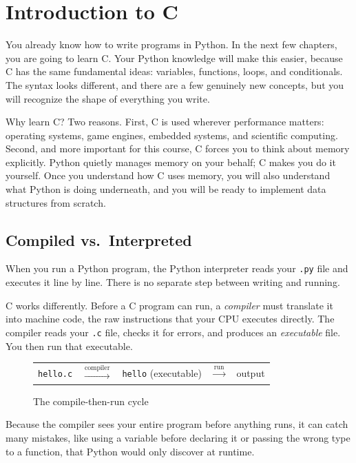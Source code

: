 \chapter{Introduction to C}

You already know how to write programs in Python.  In the next few
chapters, you are going to learn C.  Your Python knowledge will make
this easier, because C has the same fundamental ideas: variables,
functions, loops, and conditionals.  The syntax looks different, and
there are a few genuinely new concepts, but you will recognize the shape
of everything you write.

Why learn C?  Two reasons.  First, C is used wherever performance
matters: operating systems, game engines, embedded systems, and
scientific computing.  Second, and more important for this course, C
forces you to think about memory explicitly.  Python quietly manages
memory on your behalf; C makes you do it yourself.  Once you understand
how C uses memory, you will also understand what Python is doing
underneath, and you will be ready to implement data structures from
scratch.

\section{Compiled vs.\ Interpreted}

When you run a Python program, the Python interpreter reads your
\texttt{.py} file and executes it line by line.  There is no separate
step between writing and running.

C works differently.  Before a C program can run, a
\emph{compiler} must translate it into machine code,
the raw instructions that your CPU executes directly.  The compiler
reads your \texttt{.c} file, checks it for errors, and produces an
\emph{executable} file.  You then run that executable.

\begin{figure}[h]
\centering
\begin{tabular}{ccccc}
\texttt{hello.c} & $\xrightarrow{\text{compiler}}$ &
\texttt{hello} (executable) & $\xrightarrow{\text{run}}$ & output
\end{tabular}
\caption{The compile-then-run cycle}
\end{figure}

Because the compiler sees your entire program before anything runs, it
can catch many mistakes, like using a variable before declaring it or
passing the wrong type to a function, that Python would only discover
at runtime.

